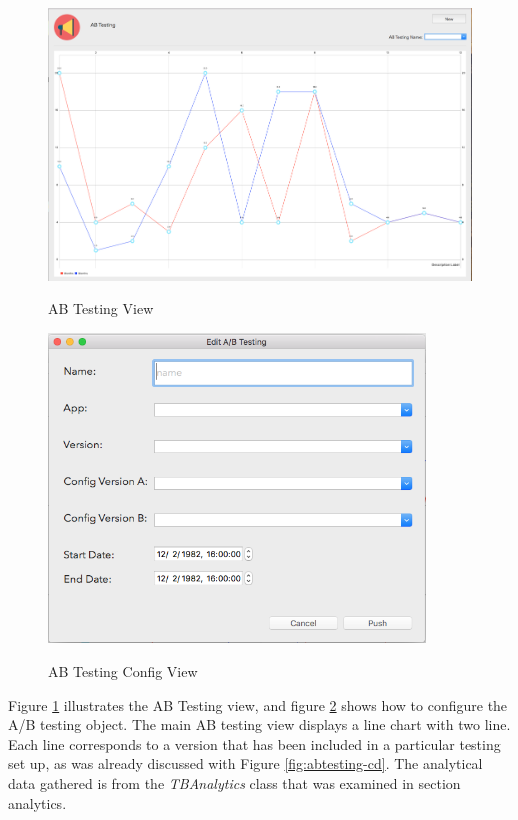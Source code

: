 \begin{figure}[!h]
    \caption{AB Testing View}
    \centering
    \includegraphics[width=120mm]{images/dashboard/abtesting}
    \label{fig:abtesting-view}
\end{figure} 

\begin{figure}[!h]
    \caption{AB Testing Config View}
    \centering
    \includegraphics[width=100mm]{images/dashboard/abtesting-config}
    \label{fig:abtesting-config-view}
\end{figure} 

Figure \ref{fig:abtesting-view} illustrates the AB Testing view, and figure \ref{fig:abtesting-config-view} shows how to configure the A/B testing object. The main AB testing view displays a line chart with two line. Each line corresponds to a version that has been included in a particular testing set up, as was already discussed with Figure \ref{fig:abtesting-cd}. The analytical data gathered is from the \textit{TBAnalytics} class that was examined in section analytics.

